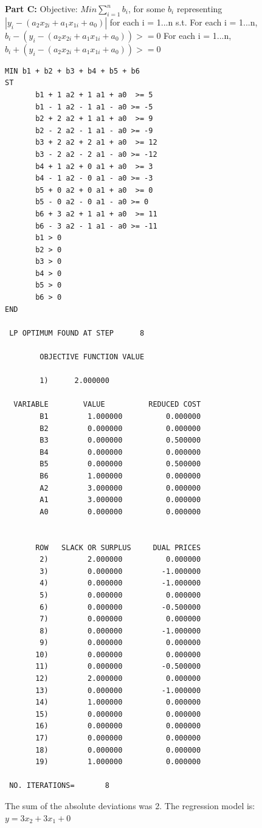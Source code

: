 \documentclass[paper=a4, fontsize=11pt]{scrartcl} %
\numberwithin{equation}{section} %
\numberwithin{figure}{section} %
\numberwithin{table}{section} %
\begin{document}
\textbf{Part C:}
	Objective:\newline    
    $Min \sum_{i=1}^{n}{b_i}$, for some $b_i$ representing $|y_i - (a_2 x_{2i} + a_1x_{1i} + a_0)|$ for each i = 1...n\newline
    s.t.\newline
    For each i = 1...n, $b_i - (y_i - (a_2 x_{2i} + a_1x_{1i} + a_0)) >= 0$\newline
    For each i = 1...n, $b_i + (y_i - (a_2 x_{2i} + a_1x_{1i} + a_0)) >= 0$\newline
	
\begin{verbatim}
MIN b1 + b2 + b3 + b4 + b5 + b6
ST
	   b1 + 1 a2 + 1 a1 + a0  >= 5
	   b1 - 1 a2 - 1 a1 - a0 >= -5
	   b2 + 2 a2 + 1 a1 + a0  >= 9
	   b2 - 2 a2 - 1 a1 - a0 >= -9	
	   b3 + 2 a2 + 2 a1 + a0  >= 12
	   b3 - 2 a2 - 2 a1 - a0 >= -12
	   b4 + 1 a2 + 0 a1 + a0  >= 3
	   b4 - 1 a2 - 0 a1 - a0 >= -3
	   b5 + 0 a2 + 0 a1 + a0  >= 0
	   b5 - 0 a2 - 0 a1 - a0 >= 0
	   b6 + 3 a2 + 1 a1 + a0  >= 11
	   b6 - 3 a2 - 1 a1 - a0 >= -11
	   b1 > 0
	   b2 > 0
	   b3 > 0
	   b4 > 0
	   b5 > 0
	   b6 > 0
END

 LP OPTIMUM FOUND AT STEP      8

        OBJECTIVE FUNCTION VALUE

        1)      2.000000

  VARIABLE        VALUE          REDUCED COST
        B1         1.000000          0.000000
        B2         0.000000          0.000000
        B3         0.000000          0.500000
        B4         0.000000          0.000000
        B5         0.000000          0.500000
        B6         1.000000          0.000000
        A2         3.000000          0.000000
        A1         3.000000          0.000000
        A0         0.000000          0.000000


       ROW   SLACK OR SURPLUS     DUAL PRICES
        2)         2.000000          0.000000
        3)         0.000000         -1.000000
        4)         0.000000         -1.000000
        5)         0.000000          0.000000
        6)         0.000000         -0.500000
        7)         0.000000          0.000000
        8)         0.000000         -1.000000
        9)         0.000000          0.000000
       10)         0.000000          0.000000
       11)         0.000000         -0.500000
       12)         2.000000          0.000000
       13)         0.000000         -1.000000
       14)         1.000000          0.000000
       15)         0.000000          0.000000
       16)         0.000000          0.000000
       17)         0.000000          0.000000
       18)         0.000000          0.000000
       19)         1.000000          0.000000

 NO. ITERATIONS=       8
    \end{verbatim}
    The sum of the absolute deviations was 2.\newline
    The regression model is: $y = 3x_2 + 3x_1 + 0$
\end{document}
